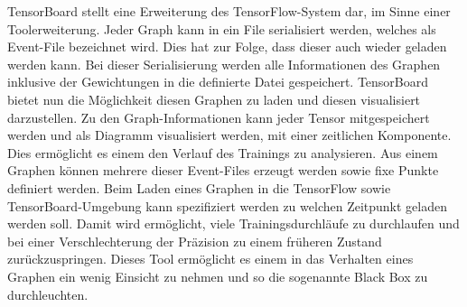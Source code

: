 TensorBoard stellt eine Erweiterung des TensorFlow-System dar, im Sinne einer Toolerweiterung. 
Jeder Graph kann in ein File serialisiert werden, welches als Event-File bezeichnet wird. 
Dies hat zur Folge, dass dieser auch wieder geladen werden kann. 
Bei dieser Serialisierung werden alle Informationen des Graphen inklusive der Gewichtungen in die definierte Datei gespeichert.
TensorBoard bietet nun die Möglichkeit diesen Graphen zu laden und diesen visualisiert darzustellen.
Zu den Graph-Informationen kann jeder Tensor mitgespeichert werden und als Diagramm visualisiert werden, mit einer zeitlichen Komponente. 
Dies ermöglicht es einem den Verlauf des Trainings zu analysieren. 
Aus einem Graphen können mehrere dieser Event-Files erzeugt werden sowie fixe Punkte definiert werden. 
Beim Laden eines Graphen in die TensorFlow sowie TensorBoard-Umgebung kann spezifiziert werden zu welchen Zeitpunkt geladen werden soll. 
Damit wird ermöglicht, viele Trainingsdurchläufe zu durchlaufen und bei einer Verschlechterung der Präzision zu einem früheren Zustand zurückzuspringen.
Dieses Tool ermöglicht es einem in das Verhalten eines Graphen ein wenig Einsicht zu nehmen und so die sogenannte Black Box zu durchleuchten. 

